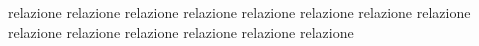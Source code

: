 \documentclass[11pt, twoside, twocolumn, a4paper]{article}
\numberwithin{equation}{section}
\numberwithin{figure}{section}
\numberwithin{table}{section}
\begin{document}
	

    \twocolumn

	{relazione}
    \twocolumn
	{relazione}
    \twocolumn
	{relazione}
    \twocolumn
	{relazione}
    \twocolumn
	{relazione}
    \twocolumn
	{relazione}
    \twocolumn
	{relazione}
    \twocolumn
	{relazione}
    \twocolumn
	{relazione}
    \twocolumn
	{relazione}
    \twocolumn
	{relazione}
    \twocolumn
	{relazione}
    \twocolumn
	{relazione}
    \twocolumn
	{relazione}
\end{document}
